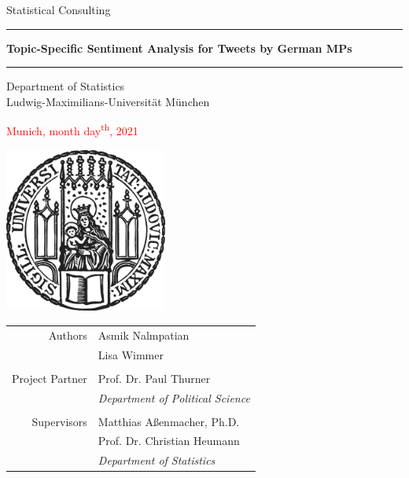 \documentclass[12pt]{article}
\begin{document}


 
\begin{titlepage}
\begin{center}
    
\LARGE
Statistical Consulting
    
\vspace{0.5cm}
      
\rule{\textwidth}{1.5pt}
\Huge
\textbf{Topic-Specific Sentiment Analysis for Tweets by German MPs}
\rule{\textwidth}{1.5pt}
   
\vspace{0.5cm}
      
\large
Department of Statistics \\
Ludwig-Maximilians-Universität München 

\vfill

\textcolor{red}{Munich, month day\textsuperscript{th}, 2021}
      
\vfill

\includegraphics[width = 0.4\textwidth]{figures/sigillum.png}

\vfill

\begin{tabular}{rl}
  Authors & Asmik Nalmpatian \\
  & Lisa Wimmer \\
  & \\
  Project Partner & Prof. Dr. Paul Thurner \\
  & \textit{Department of Political Science} \\
  & \\
  Supervisors & Matthias Aßenmacher, Ph.D. \\
  & Prof. Dr. Christian Heumann \\
  & \textit{Department of Statistics}
\end{tabular}

\end{center}
\end{titlepage}
\end{document}
